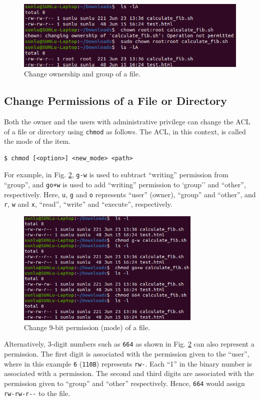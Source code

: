 \begin{figure}[htbp]
	\centering
	\includegraphics[width=350pt]{chapters/part-1/figures/chownexp.png}
	\caption{Change ownership and group of a file.} \label{ch:fm:fig:chownexp}
\end{figure}

\subsection{Change Permissions of a File or Directory}

Both the owner and the users with administrative privilege can change the ACL of a file or directory using \verb|chmod| as follows. The ACL, in this context, is called the mode of the item.
\begin{lstlisting}
$ chmod [<option>] <new_mode> <path>
\end{lstlisting}
For example, in Fig. \ref{ch:fm:fig:chmodexp}, \verb|g-w| is used to subtract ``writing'' permission from ``group'', and \verb|go+w| is used to add ``writing'' permission to `group'' and ``other'', respectively. Here, \verb|u|, \verb|g| and \verb|o| represents ``user'' (owner), ``group'' and ``other'', and \verb|r|, \verb|w| and \verb|x|, ``read'', ``write'' and ``execute'', respectively.
\begin{figure}[htbp]
	\centering
	\includegraphics[width=250pt]{chapters/part-1/figures/chmodexp.png}
	\caption{Change 9-bit permission (mode) of a file.} \label{ch:fm:fig:chmodexp}
\end{figure}
Alternatively, 3-digit numbers such as \verb|664| as shown in Fig. \ref{ch:fm:fig:chmodexp} can also represent a permission. The first digit is associated with the permission given to the ``user'', where in this example \verb|6| (\verb|110B|) represents \verb|rw-|. Each ``1'' in the binary number is associated with a permission. The second and third digits are associated with the permission given to ``group'' and ``other'' respectively. Hence, \verb|664| would assign \verb|rw-rw-r--| to the file.

